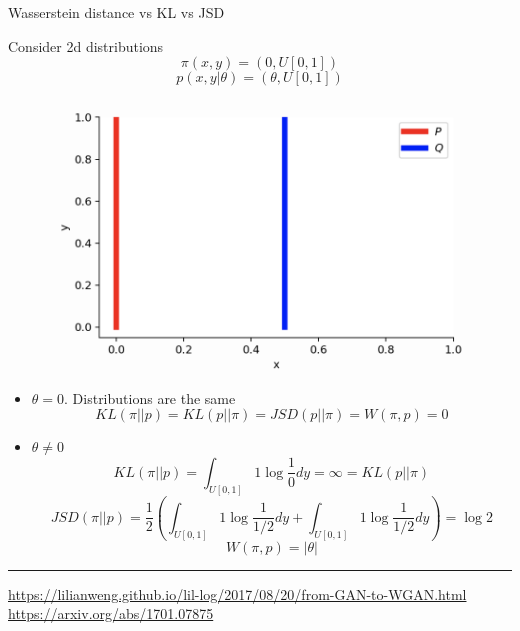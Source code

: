 \documentclass{beamer}
\begin{document}
\begin{frame}{Wasserstein distance vs KL vs JSD}
	
	\begin{minipage}[t]{0.48\columnwidth}
		\vspace{0.1cm}
		Consider 2d distributions
		\[
			\pi(x, y) = (0, U[0,1])
		\]	
		\[
			p(x, y | \theta) = (\theta, U[0, 1])
		\]
	\end{minipage}%
	\begin{minipage}[t]{0.52\columnwidth}
		\begin{figure}
			\centering
			\includegraphics[width=0.8\linewidth]{figs/w_kl_jsd}
		\end{figure}
	\end{minipage}
	\begin{itemize}
		\footnotesize
		\item $\theta = 0$.
		Distributions are the same 
		\[
			KL(\pi || p) = KL(p || \pi) = JSD(p || \pi) = W(\pi, p) = 0
		\]
		\item $\theta \neq 0$
		\[
			KL(\pi || p) = \int_{U[0, 1]} 1 \log \frac{1}{0} d y = \infty = KL(p || \pi)
		\]
		\[
			JSD(\pi || p) = \frac{1}{2}\left( \int_{U[0, 1]}1 \log \frac{1}{1/2} dy + \int_{U[0, 1]}1 \log \frac{1}{1/2} dy \right) = \log 2
		\]
		\[
			W(\pi, p) = |\theta|
		\]
	\end{itemize}
	\vfill
	\hrule\medskip 
	{\scriptsize  \href{https://lilianweng.github.io/lil-log/2017/08/20/from-GAN-to-WGAN.html}{https://lilianweng.github.io/lil-log/2017/08/20/from-GAN-to-WGAN.html} \\ \href{https://arxiv.org/abs/1701.07875}{https://arxiv.org/abs/1701.07875}}
\end{frame}
\end{document}
